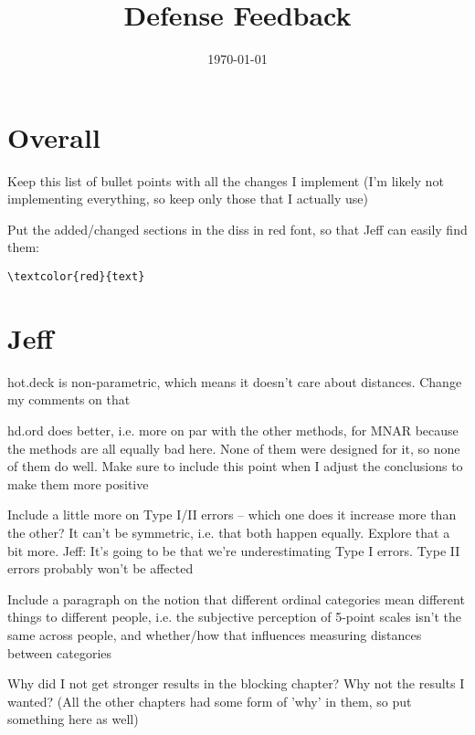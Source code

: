 \documentclass[12pt]{article}
\title{Defense Feedback}
\date{\today}
\begin{document}
\maketitle

\section*{Overall}
	\begin{coi}
		\item Keep this list of bullet points with all the changes I implement (I'm likely not implementing everything, so keep only those that I actually use)
		\item Put the added/changed sections in the diss in red font, so that Jeff can easily find them:\begin{verbatim}\textcolor{red}{text}\end{verbatim}
	\end{coi}

\section*{Jeff}
	\begin{coi}
		\item hot.deck is non-parametric, which means it doesn't care about distances. Change my comments on that
		\item hd.ord does better, i.e. more on par with the other methods, for MNAR because the methods are all equally bad here. None of them were designed for it, so none of them do well. Make sure to include this point when I adjust the conclusions to make them more positive
		\item Include a little more on Type I/II errors -- which one does it increase more than the other? It can't be symmetric, i.e. that both happen equally. Explore that a bit more. Jeff: It's going to be that we're underestimating Type I errors. Type II errors probably won't be affected
		\item Include a paragraph on the notion that different ordinal categories mean different things to different people, i.e. the subjective perception of 5-point scales isn't the same across people, and whether/how that influences measuring distances between categories
		\item Why did I not get stronger results in the blocking chapter? Why not the results I wanted? (All the other chapters had some form of 'why' in them, so put something here as well)
	\end{coi}
\end{document}
